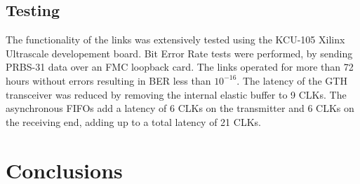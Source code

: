 \documentclass[a4paper]{PoS}
\begin{document}
\subsection{Testing}
The functionality of the links was extensively tested using the KCU-105 Xilinx Ultrascale developement board. Bit Error Rate tests were performed, by sending PRBS-31 data over an FMC loopback card. The links operated for more than 72 hours without errors resulting in BER less than $10^{-16}$. The latency of the GTH transceiver was reduced by removing the internal elastic buffer to 9 CLKs. The asynchronous FIFOs add a latency of 6 CLKs on the transmitter and 6 CLKs on the receiving end, adding up to a total latency of 21 CLKs. 



\section{Conclusions}




 


\end{document}
